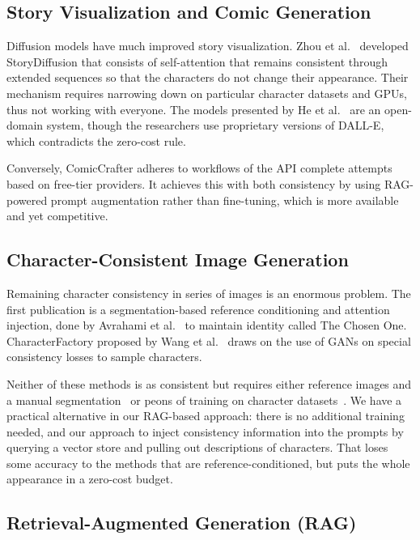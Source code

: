 \documentclass[runningheads]{llncs}
\begin{document}
\subsection{Story Visualization and Comic Generation}

Diffusion models have much improved story visualization. Zhou et al.~\cite{zhou2024storydiffusion} developed StoryDiffusion that consists of self-attention that remains consistent through extended sequences so that the characters do not change their appearance. Their mechanism requires narrowing down on particular character datasets and GPUs, thus not working with everyone. The models presented by He et al.~\cite{he2024dreamstory} are an open-domain system, though the researchers use proprietary versions of DALL-E, which contradicts the zero-cost rule.

Conversely, ComicCrafter adheres to workflows of the API complete attempts based on free-tier providers. It achieves this with both consistency by using RAG-powered prompt augmentation rather than fine-tuning, which is more available and yet competitive.

\subsection{Character-Consistent Image Generation}

Remaining character consistency in series of images is an enormous problem. The first publication is a segmentation-based reference conditioning and attention injection, done by Avrahami et al.~\cite{avrahami2024chosen} to maintain identity called The Chosen One. CharacterFactory proposed by Wang et al.~\cite{wang2025characterfactory} draws on the use of GANs on special consistency losses to sample characters.

Neither of these methods is as consistent but requires either reference images and a manual segmentation~\cite{avrahami2024chosen} or peons of training on character datasets~\cite{wang2025characterfactory}. We have a practical alternative in our RAG-based approach: there is no additional training needed, and our approach to inject consistency information into the prompts by querying a vector store and pulling out descriptions of characters. That loses some accuracy to the methods that are reference-conditioned, but puts the whole appearance in a zero-cost budget.

\subsection{Retrieval-Augmented Generation (RAG)}
\end{document}
